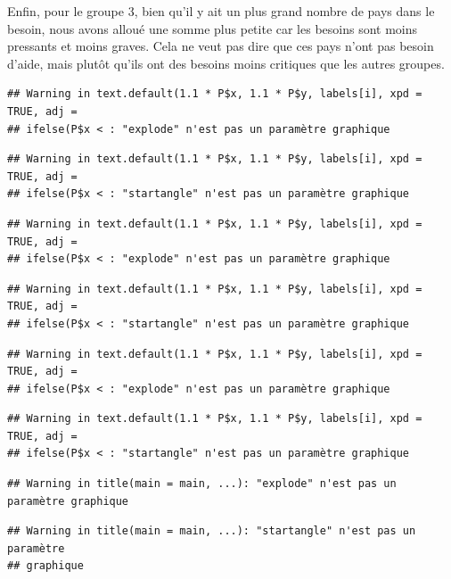 \documentclass[
]{article}
\begin{document}
Enfin, pour le groupe 3, bien qu'il y ait un plus grand nombre de pays
dans le besoin, nous avons alloué une somme plus petite car les besoins
sont moins pressants et moins graves. Cela ne veut pas dire que ces pays
n'ont pas besoin d'aide, mais plutôt qu'ils ont des besoins moins
critiques que les autres groupes.

\begin{verbatim}
## Warning in text.default(1.1 * P$x, 1.1 * P$y, labels[i], xpd = TRUE, adj =
## ifelse(P$x < : "explode" n'est pas un paramètre graphique
\end{verbatim}

\begin{verbatim}
## Warning in text.default(1.1 * P$x, 1.1 * P$y, labels[i], xpd = TRUE, adj =
## ifelse(P$x < : "startangle" n'est pas un paramètre graphique
\end{verbatim}

\begin{verbatim}
## Warning in text.default(1.1 * P$x, 1.1 * P$y, labels[i], xpd = TRUE, adj =
## ifelse(P$x < : "explode" n'est pas un paramètre graphique
\end{verbatim}

\begin{verbatim}
## Warning in text.default(1.1 * P$x, 1.1 * P$y, labels[i], xpd = TRUE, adj =
## ifelse(P$x < : "startangle" n'est pas un paramètre graphique
\end{verbatim}

\begin{verbatim}
## Warning in text.default(1.1 * P$x, 1.1 * P$y, labels[i], xpd = TRUE, adj =
## ifelse(P$x < : "explode" n'est pas un paramètre graphique
\end{verbatim}

\begin{verbatim}
## Warning in text.default(1.1 * P$x, 1.1 * P$y, labels[i], xpd = TRUE, adj =
## ifelse(P$x < : "startangle" n'est pas un paramètre graphique
\end{verbatim}

\begin{verbatim}
## Warning in title(main = main, ...): "explode" n'est pas un paramètre graphique
\end{verbatim}

\begin{verbatim}
## Warning in title(main = main, ...): "startangle" n'est pas un paramètre
## graphique
\end{verbatim}
\end{document}
